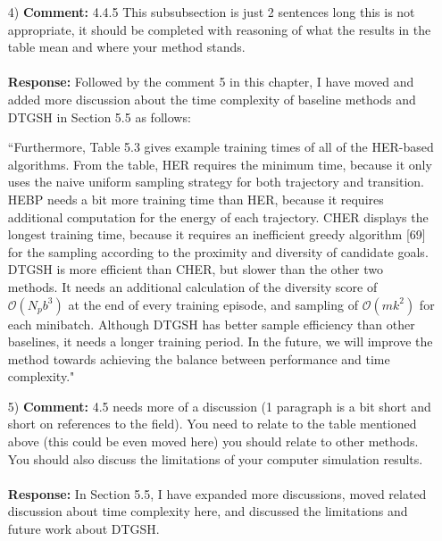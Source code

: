 \documentclass[11pt]{article}
\begin{document}
\begin{enumerate}
\item[4)] \textbf{Comment:} 4.4.5 This subsubsection is just 2 sentences long this is not appropriate, it should be completed with reasoning of what the results in the table mean and where your method stands.\\ \\
\textbf{Response:} Followed by the comment 5 in this chapter, I have moved and added more discussion about the time complexity of baseline methods and DTGSH in Section 5.5 as follows:

``Furthermore, Table 5.3 gives example training times of all of the HER-based algorithms. From the table, HER requires the minimum time, because it only uses the naive uniform sampling strategy for both trajectory and transition. HEBP needs a bit more training time than HER, because it requires additional computation for the energy of each trajectory. CHER displays the longest training time, because it requires an inefficient greedy algorithm [69] for the sampling according to the proximity and diversity of candidate goals. DTGSH is more efficient than CHER, but slower than the other two methods. It needs an additional calculation of the diversity score of $\mathcal{O}(N_{p}b^3)$ at the end of every training episode, and sampling of $\mathcal{O}(mk^2)$ for each minibatch. Although DTGSH has better sample efficiency than other baselines, it needs a longer training period. In the future, we will improve the method towards achieving the balance between performance and time complexity."

\item[5)] \textbf{Comment:} 4.5 needs more of a discussion (1 paragraph is a bit short and short on references to the field). You need to relate to the table mentioned above (this could be even moved here) you should relate to other methods. You should also discuss the limitations of your computer simulation results.\\ \\
\textbf{Response:} In Section 5.5, I have expanded more discussions, moved related discussion about time complexity here, and discussed the limitations and future work about DTGSH.
\end{enumerate}



\newpage
\end{document}
